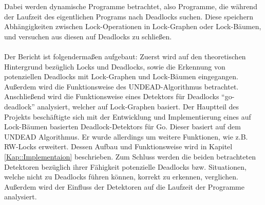 Dabei werden 
dynamische Programme betrachtet, also Programme, die während der Laufzeit des 
eigentlichen Programs nach Deadlocks suchen. Diese speichern Abhängigkeiten 
zwischen Lock-Operationen in Lock-Graphen oder Lock-Bäumen, und versuchen aus 
diesen auf Deadlocks zu schließen.\\\\
Der Bericht ist folgendermaßen aufgebaut: Zuerst wird auf den theoretischen 
Hintergrund bezüglich Locks und Deadlocks, sowie die Erkennung von 
potenziellen Deadlocks mit Lock-Graphen und Lock-Bäumen eingegangen. Außerdem 
wird die Funktionsweise des UNDEAD-Algorithmus \cite{zhou} betrachtet.
Anschließend
wird die Funktionsweise eines Detektors für Deadlocks ``go-deadlock'' 
\cite{sasha-s} analysiert, welcher auf Lock-Graphen basiert. Der Hauptteil 
des Projekts beschäftigte sich mit der Entwicklung und Implementierung eines 
auf Lock-Bäumen basierten Deadlock-Detektors für Go. Dieser basiert 
auf dem UNDEAD Algorithmus. Er wurde allerdings um weitere Funktionen,
wie z.B. RW-Locks erweitert. Dessen Aufbau und Funktionsweise wird in Kapitel 
\ref{Kap::Implementaion} beschrieben. Zum Schluss werden die beiden betrachteten 
Detektoren bezüglich ihrer Fähigkeit potenzielle Deadlocks bzw. 
Situationen, welche nicht zu Deadlocks führen können, korrekt zu erkennen, verglichen.
Außerdem 
wird der Einfluss der Detektoren auf die Laufzeit der Programme analysiert.

